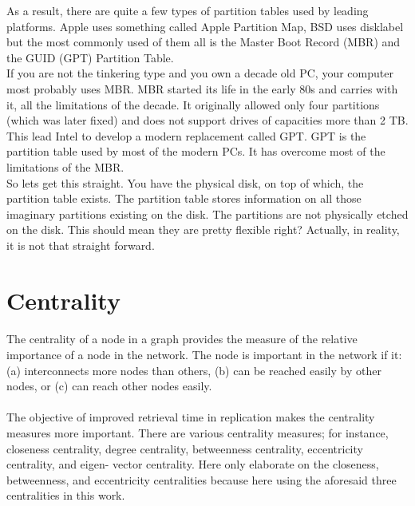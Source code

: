 As a result, there are quite a few types of partition tables used by leading
platforms. Apple uses something called Apple Partition Map, BSD uses disklabel
but the most commonly used of them all is the Master Boot Record (MBR) and the
GUID (GPT) Partition Table.\\

If you are not the tinkering type and you own a decade old PC, your computer
most probably uses MBR. MBR started its life in the early 80s and carries with
it, all the limitations of the decade. It originally allowed only four
partitions (which was later fixed) and does not support drives of capacities
more than 2 TB. This lead Intel to develop a modern replacement called GPT. GPT
is the partition table used by most of the modern PCs. It has overcome most of
the limitations of the MBR.\\

So lets get this straight. You have the physical disk, on top of which, the
partition table exists. The partition table stores information on all those
imaginary partitions existing on the disk. The partitions are not physically
etched on the disk. This should mean they are pretty flexible right? Actually,
in reality, it is not that straight forward.


\section{Centrality}
\paragraph{}
The centrality of a node in a graph provides the measure of the relative importance
of a node in the network. The node is important in the network if it:
\newline (a) interconnects more nodes than others,
\newline (b) can be reached easily by other nodes, or 
\newline(c) can reach other nodes easily.
\paragraph{}
The objective of improved retrieval time in replication makes the centrality measures
more important. There are various centrality measures; for instance, closeness centrality,
degree centrality, betweenness centrality, eccentricity centrality, and eigen- vector centrality.
Here only elaborate on the closeness, betweenness, and eccentricity centralities because here
using the aforesaid three centralities in this work.
